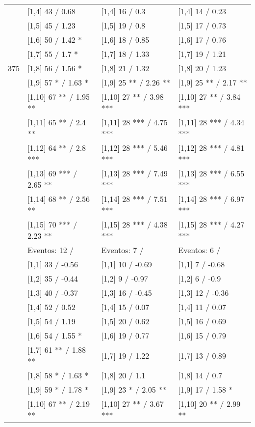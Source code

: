 \begin{table}
\begin{tabular}[t]{llll}
\addlinespace
 & {}[1,4] 43  / 0.68 & {}[1,4] 16  / 0.3 & {}[1,4] 14  / 0.23\\
 & {}[1,5] 45  / 1.23 & {}[1,5] 19  / 0.8 & {}[1,5] 17  / 0.73\\
 & {}[1,6] 50  / 1.42 * & {}[1,6] 18  / 0.85 & {}[1,6] 17  / 0.76\\
 & {}[1,7] 55  / 1.7 * & {}[1,7] 18  / 1.33 & {}[1,7] 19  / 1.21\\
375 & {}[1,8] 56  / 1.56 * & {}[1,8] 21  / 1.32 & {}[1,8] 20  / 1.23\\
\addlinespace
 & {}[1,9] 57 * / 1.63 * & {}[1,9] 25 ** / 2.26 ** & {}[1,9] 25 ** / 2.17 **\\
 & {}[1,10] 67 ** / 1.95 ** & {}[1,10] 27 ** / 3.98 *** & {}[1,10] 27 ** / 3.84 ***\\
 & {}[1,11] 65 ** / 2.4 ** & {}[1,11] 28 *** / 4.75 *** & {}[1,11] 28 *** / 4.34 ***\\
 & {}[1,12] 64 ** / 2.8 *** & {}[1,12] 28 *** / 5.46 *** & {}[1,12] 28 *** / 4.81 ***\\
 & {}[1,13] 69 *** / 2.65 ** & {}[1,13] 28 *** / 7.49 *** & {}[1,13] 28 *** / 6.55 ***\\
\addlinespace
 & {}[1,14] 68 ** / 2.56 ** & {}[1,14] 28 *** / 7.51 *** & {}[1,14] 28 *** / 6.97 ***\\
 & {}[1,15] 70 *** / 2.23 ** & {}[1,15] 28 *** / 4.38 *** & {}[1,15] 28 *** / 4.27 ***\\
 & Eventos:  12 / & Eventos:  7 / & Eventos:  6 /\\
 & {}[1,1] 33  / -0.56 & {}[1,1] 10  / -0.69 & {}[1,1] 7  / -0.68\\
 & {}[1,2] 35  / -0.44 & {}[1,2] 9  / -0.97 & {}[1,2] 6  / -0.9\\
\addlinespace
 & {}[1,3] 40  / -0.37 & {}[1,3] 16  / -0.45 & {}[1,3] 12  / -0.36\\
 & {}[1,4] 52  / 0.52 & {}[1,4] 15  / 0.07 & {}[1,4] 11  / 0.07\\
 & {}[1,5] 54  / 1.19 & {}[1,5] 20  / 0.62 & {}[1,5] 16  / 0.69\\
 & {}[1,6] 54  / 1.55 * & {}[1,6] 19  / 0.77 & {}[1,6] 15  / 0.79\\
 & {}[1,7] 61 ** / 1.88 ** & {}[1,7] 19  / 1.22 & {}[1,7] 13  / 0.89\\
\addlinespace
500 & {}[1,8] 58 * / 1.63 * & {}[1,8] 20  / 1.1 & {}[1,8] 14  / 0.7\\
 & {}[1,9] 59 * / 1.78 * & {}[1,9] 23 * / 2.05 ** & {}[1,9] 17  / 1.58 *\\
 & {}[1,10] 67 ** / 2.19 ** & {}[1,10] 27 ** / 3.67 *** & {}[1,10] 20 ** / 2.99 **\\

\end{tabular}
\end{table}
